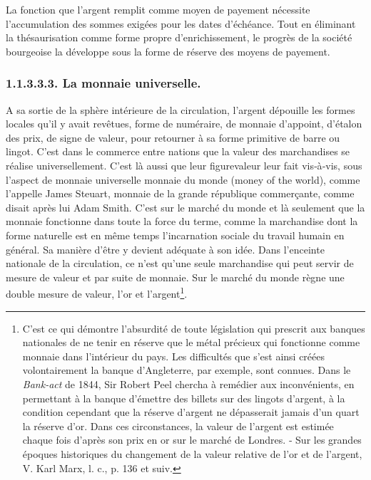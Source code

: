 \documentclass[french,twoside]{book} %
\begin{document}
La fonction que l’argent remplit comme moyen de payement nécessite l’accumulation des sommes exigées pour les dates d’échéance. Tout en éliminant la thésaurisation comme forme propre d’enrichissement, le progrès de la société bourgeoise la développe sous la forme de réserve des moyens de payement.
\subsubsection[{1.1.3.3.3. La monnaie universelle.}]{1.1.3.3.3. La monnaie universelle.}
\noindent A sa sortie de la sphère intérieure de la circulation, l’argent dépouille les formes locales qu’il y avait revêtues, forme de numéraire, de monnaie d’appoint, d’étalon des prix, de signe de valeur, pour retourner à sa forme primitive de barre ou lingot. C’est dans le commerce entre nations que la valeur des marchandises se réalise universellement. C’est là aussi que leur figurevaleur leur fait vis‑à‑vis, sous l’aspect de monnaie universelle monnaie du monde (money of the world), comme l’appelle James Steuart, monnaie de la grande république commerçante, comme disait après lui Adam Smith. C’est sur le marché du monde et là seulement que la monnaie fonctionne dans toute la force du terme, comme la marchandise dont la forme naturelle est en même temps l’incarnation sociale du travail humain en général. Sa manière d’être y devient adéquate à son idée. Dans l’enceinte nationale de la circulation, ce n’est qu’une seule marchandise qui peut servir de mesure de valeur et par suite de monnaie. Sur le marché du monde règne une double mesure de valeur, l’or et l’argent\footnote{C’est ce qui démontre l’absurdité de toute législation qui prescrit aux banques nationales de ne tenir en réserve que le métal précieux qui fonctionne comme monnaie dans l’intérieur du pays. Les difficultés que s’est ainsi créées volontairement la banque d’Angleterre, par exemple, sont connues. Dans le \emph{Bank‑act} de 1844, Sir Robert Peel chercha à remédier aux inconvénients, en permettant à la banque d’émettre des billets sur des lingots d’argent, à la condition cependant que la réserve d’argent ne dépasserait jamais d’un quart la réserve d’or. Dans ces circonstances, la valeur de l’argent est estimée chaque fois d’après son prix en or sur le marché de Londres. ‑ Sur les grandes époques historiques du changement de la valeur relative de l’or et de l’argent, V. Karl Marx, l. c., p. 136 et suiv.}.\par
\end{document}
